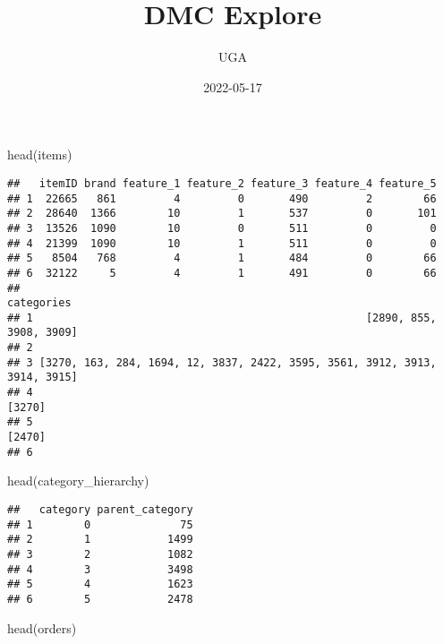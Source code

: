 \documentclass[
]{article}
\title{DMC Explore}
\author{UGA}
\date{2022-05-17}
\newenvironment{Shaded}{\begin{snugshade}}{\end{snugshade}}
\newcommand{\FunctionTok}[1]{\textcolor[rgb]{0.00,0.00,0.00}{#1}}
\newcommand{\NormalTok}[1]{#1}
\begin{document}
\maketitle

\begin{Shaded}
\begin{Highlighting}[]
\FunctionTok{head}\NormalTok{(items)}
\end{Highlighting}
\end{Shaded}

\begin{verbatim}
##   itemID brand feature_1 feature_2 feature_3 feature_4 feature_5
## 1  22665   861         4         0       490         2        66
## 2  28640  1366        10         1       537         0       101
## 3  13526  1090        10         0       511         0         0
## 4  21399  1090        10         1       511         0         0
## 5   8504   768         4         1       484         0        66
## 6  32122     5         4         1       491         0        66
##                                                                   categories
## 1                                                    [2890, 855, 3908, 3909]
## 2                                                                           
## 3 [3270, 163, 284, 1694, 12, 3837, 2422, 3595, 3561, 3912, 3913, 3914, 3915]
## 4                                                                     [3270]
## 5                                                                     [2470]
## 6
\end{verbatim}

\begin{Shaded}
\begin{Highlighting}[]
\FunctionTok{head}\NormalTok{(category\_hierarchy)}
\end{Highlighting}
\end{Shaded}

\begin{verbatim}
##   category parent_category
## 1        0              75
## 2        1            1499
## 3        2            1082
## 4        3            3498
## 5        4            1623
## 6        5            2478
\end{verbatim}

\begin{Shaded}
\begin{Highlighting}[]
\FunctionTok{head}\NormalTok{(orders)}
\end{Highlighting}
\end{Shaded}
\end{document}
